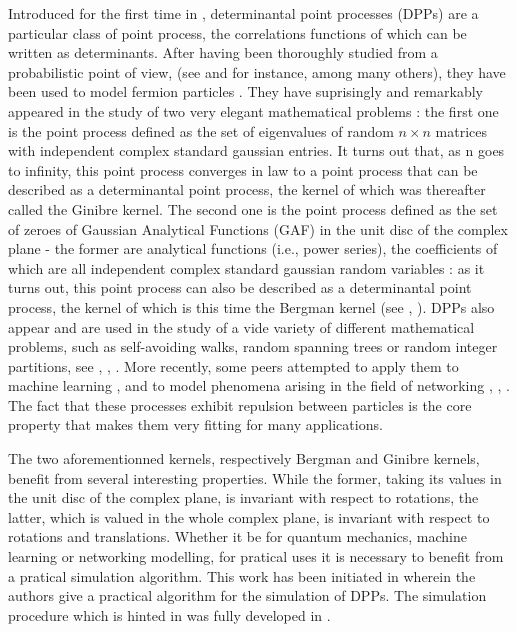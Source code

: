 \documentclass[11pt]{article}
\theoremstyle{plain}
\theoremstyle{definition}
\begin{document}
Introduced for the first time in \cite{Macchi1975}, determinantal point processes (DPPs) are a particular class of point process, the correlations functions of which can be written as determinants. After having been thoroughly studied from a probabilistic point of view, (see \cite{ShiraiTakahashi2003} and \cite{Soshnikov2000} for instance, among many others), they have been used to model fermion particles \cite{Tamura2006}. They have suprisingly and remarkably appeared in the study of two very elegant mathematical problems : the first one is the point process defined as the set of eigenvalues of random $ n \times n $ matrices with independent complex standard gaussian entries. It turns out that, as n goes to infinity, this point process converges in law to a point process that can be described \cite{Ginibre1965} as a determinantal point process, the kernel of which was thereafter called the Ginibre kernel. The second one is the point process defined as the set of zeroes of Gaussian Analytical Functions (GAF) in the unit disc of the complex plane - the former are analytical functions (i.e., power series), the coefficients of which are all independent complex standard gaussian random variables : as it turns out, this point process can also be described as a determinantal point process, the kernel of which is this time the Bergman kernel (see \cite{Hough2009ZerosGAF}, \cite{ZerosGaussianPowerSeries}). DPPs also appear and are used in the study of a vide variety of different mathematical problems, such as self-avoiding walks, random spanning trees or random integer partitions, see \cite{Burton1993}, \cite{Meliot2021}, \cite{Tao2024}. More recently, some peers attempted to apply them to machine learning \cite{DeterminantalML2013}, and to model phenomena arising in the field of networking \cite{Miyoshi2014}, \cite{TorrisiLeonardi2014}, \cite{Vergne2014}. The fact that these processes exhibit repulsion between particles is the core property that makes them very fitting for many applications.

The two aforementionned kernels, respectively Bergman and Ginibre kernels, benefit from several interesting properties. While the former, taking its values in the unit disc of the complex plane, is invariant with respect to rotations, the latter, which is valued in the whole complex plane, is invariant with respect to rotations and translations. Whether it be for quantum mechanics, machine learning or networking modelling, for pratical uses it is necessary to benefit from a pratical simulation algorithm. This work has been initiated in \cite{Hough2006} wherein the authors give a practical algorithm for the simulation of DPPs. The simulation procedure which is hinted in \cite{Ginibre1965} was fully developed in \cite{Caer1990}.
\end{document}
